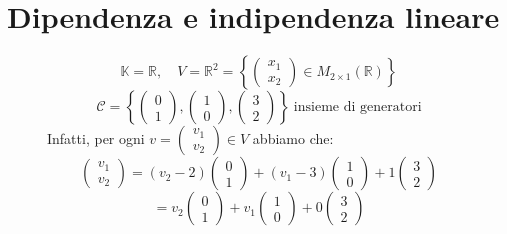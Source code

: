 \documentclass[a4paper]{article}
\theoremstyle{break}
\theoremstyle{break}
\theoremstyle{break}
\theoremstyle{break}
\begin{document}
\section{Dipendenza e indipendenza lineare}
\begin{figure}[H]
  \begin{example}
    \[
      \mathbb{K} = \mathbb{R}, \quad V = \mathbb{R}^2 = \left\{ \begin{pmatrix} 
          x_1 \\
          x_2
      \end{pmatrix} \in M_{2 \times 1}(\mathbb{R})  \right\}
    \] 
    \[
      \mathcal{C} = \left\{ \begin{pmatrix} 
          0\\1
      \end{pmatrix},
      \begin{pmatrix} 
        1\\0
      \end{pmatrix},
      \begin{pmatrix} 
        3\\2
      \end{pmatrix} 
    \right\}\; \text{insieme di generatori}
    \] 
    Infatti, per ogni \( v = \begin{pmatrix} v_1\\v_2 \end{pmatrix} \in V \) abbiamo che:
    \[
    \begin{pmatrix} 
      v_1\\
      v_2
    \end{pmatrix} 
    =
    (v_2 - 2) \begin{pmatrix} 0\\1 \end{pmatrix} 
    +
    (v_1 - 3) \begin{pmatrix} 1\\0 \end{pmatrix}
    +
    1 \begin{pmatrix} 3\\2 \end{pmatrix}
    \] 
    \[
    = v_2 \begin{pmatrix} 0\\1 \end{pmatrix}
    +
    v_1 \begin{pmatrix} 1\\0 \end{pmatrix}
    +
    0 \begin{pmatrix} 3\\2 \end{pmatrix}
\]
\end{example}
\end{figure}
\end{document}
